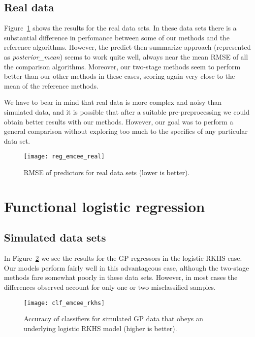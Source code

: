 \subsection*{Real data}

Figure~\ref{fig:reg_emcee_real} shows the results for the real data sets. In these data sets there is a substantial difference in perfomance between some of our methods and the reference algorithms. However, the predict-then-summarize approach (represented as \textit{posterior\_mean}) seems to work quite well, always near the mean RMSE of all the comparison algorithms. Moreover, our two-stage methods seem to perform better than our other methods in these cases, scoring again very close to the mean of the reference methods.

We have to bear in mind that real data is more complex and noisy than simulated data, and it is possible that after a suitable pre-preprocessing we could obtain better results with our methods. However, our goal was to perform a general comparison without exploring too much to the specifics of any particular data set.

\begin{figure}[ht!]
  \centering
  \texttt{[image: reg\_emcee\_real]}
  \caption{RMSE of predictors for real data sets (lower is better).}\label{fig:reg_emcee_real}
\end{figure}

\section{Functional logistic regression}

\subsection*{Simulated data sets}

In Figure~\ref{fig:clf_emcee_rkhs} we see the results for the GP regressors in the logistic RKHS case. Our models perform fairly well in this advantageous case, although the two-stage methods fare somewhat poorly in these data sets. However, in most cases the differences observed account for only one or two misclassified samples.

\begin{figure}[ht!]
  \centering
  \texttt{[image: clf\_emcee\_rkhs]}
  \caption{Accuracy of classifiers for simulated GP data that obeys an underlying logistic RKHS model (higher is better).}\label{fig:clf_emcee_rkhs}
\end{figure}

